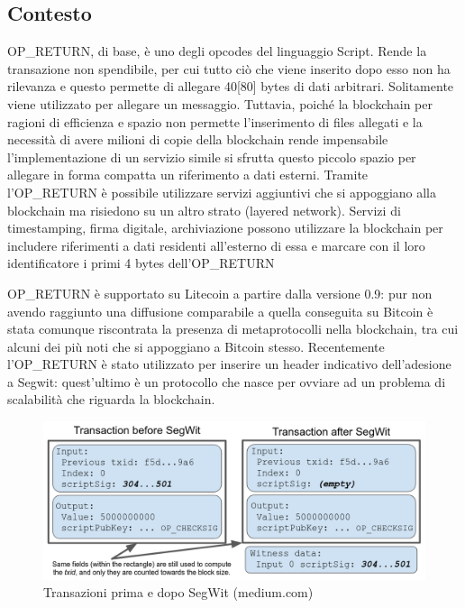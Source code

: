 \subsection{Contesto}
OP\_RETURN, di base, è uno degli opcodes del linguaggio Script. Rende la transazione non spendibile, per cui tutto ciò che viene inserito dopo esso non ha rilevanza e questo permette di allegare 40[80] bytes di dati arbitrari. Solitamente viene utilizzato per allegare un messaggio. Tuttavia, poiché la blockchain per ragioni di efficienza e spazio non permette l’inserimento di files allegati e la necessità di avere milioni di copie della blockchain rende impensabile l’implementazione di un servizio simile si sfrutta questo piccolo spazio per allegare in forma compatta un riferimento a dati esterni.
Tramite l’OP\_RETURN è possibile utilizzare servizi aggiuntivi che si appoggiano alla blockchain ma risiedono su un altro strato (layered network). Servizi di timestamping, firma digitale, archiviazione possono utilizzare la blockchain per includere riferimenti a dati residenti all’esterno di essa e marcare con il loro identificatore i primi 4 bytes dell’OP\_RETURN

OP\_RETURN è supportato su Litecoin a partire dalla versione 0.9: pur non avendo raggiunto una diffusione comparabile a quella conseguita su Bitcoin è stata comunque riscontrata la presenza di metaprotocolli nella blockchain, tra cui alcuni dei più noti che si appoggiano a Bitcoin stesso.
Recentemente l’OP\_RETURN è stato utilizzato per inserire un header indicativo dell’adesione a Segwit: quest’ultimo è un protocollo che nasce per ovviare ad un problema di scalabilità che riguarda la blockchain.

\begin{figure}[h!]
	\centering
	\includegraphics[width=1.0\linewidth]{images/before-after-segwit-medium}
	\caption{Transazioni prima e dopo SegWit (medium.com)}
	\label{fig:before-after-segwit-medium}
\end{figure}


